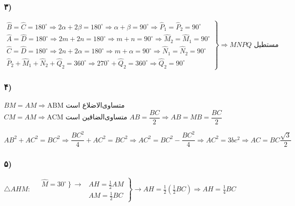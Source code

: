 \documentclass[12pt, a4paper]{book}
\begin{document}
	\subsubsection[3]{۳)}   
   	\begin{flushleft}
	$
   		\left.
   			\begin{array}{lll}
   				\widehat{B} = \widehat{C} = 180^{\circ} \Rightarrow 2 \alpha + 2 \beta =180^{\circ} \Rightarrow \alpha + \beta = 90^{\circ}  \Rightarrow \widehat{P}_1 = \widehat{P}_2 = 90^{\circ} \\
			   	\widehat{A} = \widehat{D} = 180^{\circ} \Rightarrow 2m + 2n =180^{\circ} \Rightarrow m + n = 90^{\circ}  \Rightarrow \widehat{M}_2 = \widehat{M}_1 = 90^{\circ} \\
			   	\widehat{C} = \widehat{D} = 180^{\circ} \Rightarrow 2 n + 2 \alpha =180^{\circ} \Rightarrow m + \alpha = 90^{\circ}  \Rightarrow \widehat{N}_1 = \widehat{N}_2 = 90^{\circ}  \\
	   	   		\widehat{P}_2 + \widehat{M}_1 + \widehat{N}_2 + \widehat{Q}_2= 360^{\circ} \Rightarrow 270^{\circ} + \widehat{Q}_2 = 360^{\circ} \Rightarrow \widehat{Q}_2 = 90^{\circ} 
   			\end{array}
   		\right\}
   		\Rightarrow \mbox{$MNPQ$ مستطیل}
   	$
   \end{flushleft}
   
	\subsubsection[4]{۴)}

			\begin{flushleft}
					$
					BM = AM \Rightarrow \text{ABM متساوی‌الاضلاع است}
				$
				$
					CM = AM \Rightarrow \text{ACM متساوی‌الضاقین است}
				$
				$
					AB = \dfrac{BC}{2} \Rightarrow AB =MB = \dfrac{BC}{2}
				$
				
				$
					AB^2 + AC^2 = BC^2 \Rightarrow \dfrac{BC^2}{4} + AC^2 = BC^2 \Rightarrow AC^2 = BC^2 - \dfrac{BC^2}{4} \Rightarrow AC^2 = 3bc^2 \Rightarrow AC = BC \dfrac{\sqrt{3}}{2}
				$
			\end{flushleft}

	\subsubsection[5]{۵)}
	     	\begin{flushleft}
	     		$ \triangle AHM:$
	     		$
	     			\left.
		     			\begin{array}{ccc}
		     			    &	\widehat{M} = \left. 30^{\circ} \right\} \rightarrow & AH = \frac12 AM \\
		     				& &AM = \frac12 BC
		     			\end{array}
	     			\right\}
	     			\rightarrow AH = \frac12 \left( \frac12 BC \right) \Rightarrow AH = \frac14 BC
	     		$
	     	\end{flushleft}
\end{document}
